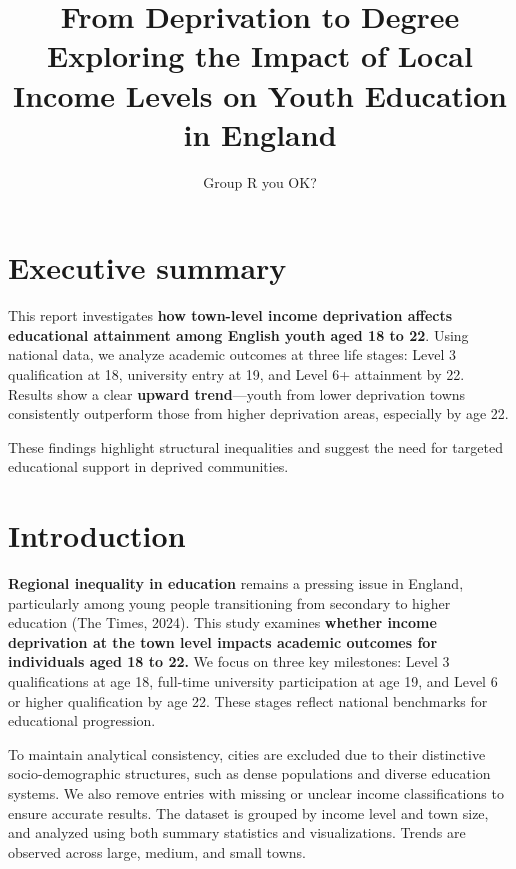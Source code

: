 \documentclass[11pt,en]{../resources/elegantpaper}
\title{From Deprivation to Degree \\[1ex] \large Exploring the Impact of
Local Income Levels on Youth Education in England}
\author{Group R you OK?}
\date{}
\begin{document}
\maketitle
\thispagestyle{empty}
\clearpage

\tableofcontents
\thispagestyle{empty}
\clearpage

\setcounter{page}{1}

\newpage

\section{Executive summary}\label{executive-summary}

This report investigates \textbf{how town-level income deprivation
affects educational attainment among English youth aged 18 to 22}. Using
national data, we analyze academic outcomes at three life stages: Level
3 qualification at 18, university entry at 19, and Level 6+ attainment
by 22. Results show a clear \textbf{upward trend}---youth from lower
deprivation towns consistently outperform those from higher deprivation
areas, especially by age 22.

These findings highlight structural inequalities and suggest the need
for targeted educational support in deprived communities.

\section{Introduction}\label{introduction}

\textbf{Regional inequality in education} remains a pressing issue in
England, particularly among young people transitioning from secondary to
higher education (The Times, 2024). This study examines \textbf{whether
income deprivation at the town level impacts academic outcomes for
individuals aged 18 to 22.} We focus on three key milestones: Level 3
qualifications at age 18, full-time university participation at age 19,
and Level 6 or higher qualification by age 22. These stages reflect
national benchmarks for educational progression.

To maintain analytical consistency, cities are excluded due to their
distinctive socio-demographic structures, such as dense populations and
diverse education systems. We also remove entries with missing or
unclear income classifications to ensure accurate results. The dataset
is grouped by income level and town size, and analyzed using both
summary statistics and visualizations. Trends are observed across large,
medium, and small towns.
\end{document}
